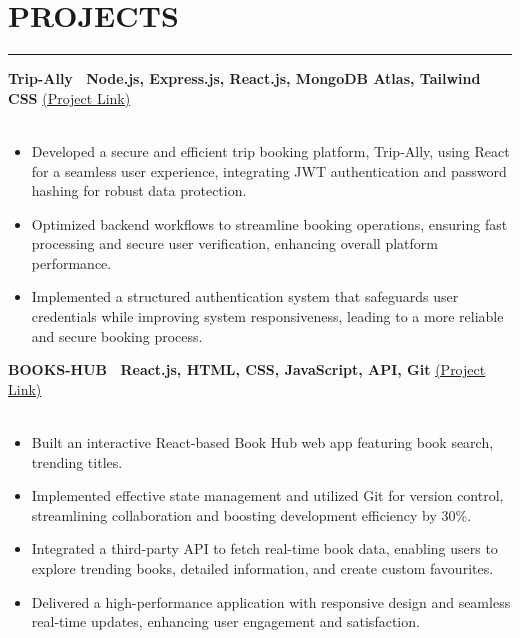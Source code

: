 \documentclass[a4paper,10pt]{article}
\newcommand{\experienceitem}[2]{%
    \noindent\textbf{#1} \hfill #2 \\
    \vspace{-0.9em}
}
\newcommand{\sectionline}[1]{%
    \par\noindent\rule[0.5ex]{\linewidth}{0.5pt}\vspace{-0.3em}%
}
\begin{document}
\section*{PROJECTS}
\sectionline{}
\experienceitem{Trip-Ally \textbar\ Node.js, Express.js, React.js, MongoDB Atlas, Tailwind CSS}{\href{https://trip-ally.vercel.app}{(Project Link)}} \\
\vspace{-0.6em}
\begin{itemize}[leftmargin=0.5in]
    \item Developed a secure and efficient trip booking platform, Trip-Ally, using React for a seamless user experience, integrating JWT authentication and password hashing for robust data protection.
    \item Optimized backend workflows to streamline booking operations, ensuring fast processing and secure user verification, enhancing overall platform performance.
    \item Implemented a structured authentication system that safeguards user credentials while improving system responsiveness, leading to a more reliable and secure booking process.
\end{itemize}

\experienceitem{BOOKS-HUB \textbar\ React.js, HTML, CSS, JavaScript, API, Git}{\href{https://github.com/Rohs21/Books-app}{(Project Link)}} \\
\vspace{-0.6em}
\begin{itemize}[leftmargin=0.5in]
    \item Built an interactive React-based Book Hub web app featuring book search, trending titles.
    \item Implemented effective state management and utilized Git for version control, streamlining collaboration and boosting development efficiency by 30\%.
    \item Integrated a third-party API to fetch real-time book data, enabling users to explore trending books, detailed information, and create custom favourites.
    \item Delivered a high-performance application with responsive design and seamless real-time updates, enhancing user engagement and satisfaction.
\end{itemize}
\end{document}
